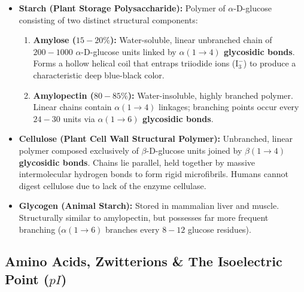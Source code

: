 \documentclass[10pt,twoside,openright]{book}
\begin{document}
\begin{usecasebox}
\begin{itemize}
  \item \textbf{Starch (Plant Storage Polysaccharide):} Polymer of $\alpha$-D-glucose consisting of two distinct structural components:
  \begin{enumerate}
    \item \textbf{Amylose ($15-20\%$):} Water-soluble, linear unbranched chain of $200-1000$ $\alpha$-D-glucose units linked by \textbf{$\alpha(1 \to 4)$ glycosidic bonds}. Forms a hollow helical coil that entraps triiodide ions ($\mathrm{I_3^-}$) to produce a characteristic deep blue-black color.
    \item \textbf{Amylopectin ($80-85\%$):} Water-insoluble, highly branched polymer. Linear chains contain $\alpha(1 \to 4)$ linkages; branching points occur every $24-30$ units via \textbf{$\alpha(1 \to 6)$ glycosidic bonds}.
  \end{enumerate}
  \item \textbf{Cellulose (Plant Cell Wall Structural Polymer):} Unbranched, linear polymer composed exclusively of $\beta$-D-glucose units joined by \textbf{$\beta(1 \to 4)$ glycosidic bonds}. Chains lie parallel, held together by massive intermolecular hydrogen bonds to form rigid microfibrils. Humans cannot digest cellulose due to lack of the enzyme cellulase.
  \item \textbf{Glycogen (Animal Starch):} Stored in mammalian liver and muscle. Structurally similar to amylopectin, but possesses far more frequent branching ($\alpha(1 \to 6)$ branches every $8-12$ glucose residues).
\end{itemize}
\end{usecasebox}

\subsection{Amino Acids, Zwitterions \& The Isoelectric Point (\texorpdfstring{$pI$}{pI})}
\end{document}
